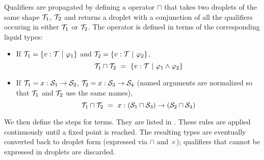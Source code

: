 Qualifiers are propagated by defining a  operator $\sqcap$ that
takes two droplets of the same shape $\mathcal{T}_1$, $\mathcal{T}_2$ and returns a droplet with a conjunction of all the qualifiers
occuring in either $\mathcal{T}_1$ or $\mathcal{T}_2$. The operator is defined in terms of the corresponding liquid types:
\begin{itemize}
  \item If $\mathcal{T}_1=\{v:\mathcal{T} ~|~ \varphi_1\}$ and $\mathcal{T}_2=\{v:\mathcal{T} ~|~ \varphi_2\}$,
	\[\mathcal{T}_1\sqcap\mathcal{T}_2 ~=~ \{v:\mathcal{T} ~|~ \varphi_1\land\varphi_2\}\]
  \item If $\mathcal{T}_1=x:\mathcal{S}_1\to\mathcal{S}_2$, $\mathcal{T}_2=x:\mathcal{S}_3\to\mathcal{S}_4$ (named arguments are normalized so that $\mathcal{T}_1$ and $\mathcal{T}_2$ use the same names),
    \[\mathcal{T}_1\sqcap\mathcal{T}_2 ~=~ x:(\mathcal{S}_1\sqcap\mathcal{S}_3)\to(\mathcal{S}_2\sqcap\mathcal{S}_4)\]
\end{itemize}

We then define the  steps for terms. They are listed in .
These rules are applied continuously until a fixed point is reached.
The resulting types are eventually converted back to droplet form (expressed via $\cap$ and $\times$);
qualifiers that cannot be expressed in droplets are discarded.

